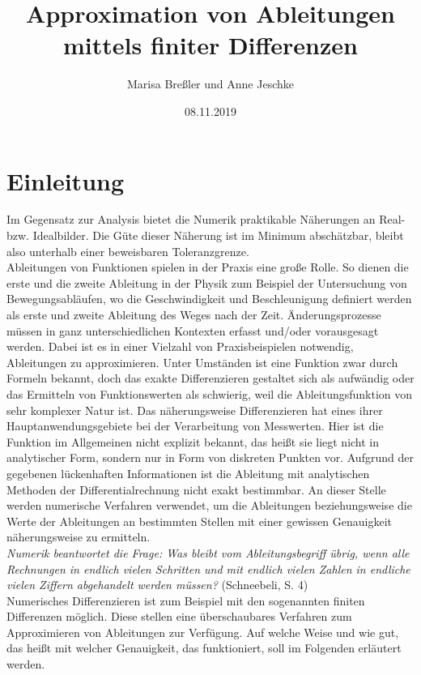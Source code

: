 \documentclass{scrartcl}
\begin{document}
\title{Approximation von Ableitungen\\mittels finiter Differenzen}
\author{Marisa Breßler und Anne Jeschke}
\date{08.11.2019}
\maketitle
\tableofcontents
\pagebreak \section{Einleitung}
\label{sec:einleitung}
Im Gegensatz zur Analysis bietet die Numerik praktikable Näherungen an Real- bzw. Idealbilder. Die Güte dieser Näherung ist im Minimum abschätzbar, bleibt also unterhalb einer beweisbaren Toleranzgrenze. \\
Ableitungen von Funktionen spielen in der Praxis eine große Rolle. So dienen die erste und die zweite Ableitung in der Physik zum Beispiel der Untersuchung von Bewegungsabläufen, wo die Geschwindigkeit und Beschleunigung definiert werden als erste und zweite Ableitung des Weges nach der Zeit. Änderungsprozesse müssen in ganz unterschiedlichen Kontexten erfasst und/oder vorausgesagt werden. Dabei ist es in einer Vielzahl von Praxisbeispielen notwendig, Ableitungen zu approximieren. Unter Umständen ist eine Funktion zwar durch Formeln bekannt, doch das exakte Differenzieren gestaltet sich als aufwändig oder das Ermitteln von Funktionswerten als schwierig, weil die Ableitungsfunktion von sehr komplexer Natur ist. Das näherungsweise Differenzieren hat eines ihrer Hauptanwendungsgebiete bei der Verarbeitung von Messwerten. Hier ist die Funktion im Allgemeinen nicht explizit bekannt, das heißt sie liegt nicht in analytischer Form, sondern nur in Form von diskreten Punkten vor. Aufgrund der gegebenen lückenhaften Informationen ist die Ableitung mit analytischen Methoden der Differentialrechnung nicht exakt bestimmbar. An dieser Stelle werden numerische Verfahren verwendet, um die Ableitungen beziehungsweise die Werte der Ableitungen an bestimmten Stellen mit einer gewissen Genauigkeit näherungsweise zu ermitteln. \\
\linebreak
\textit{Numerik beantwortet die Frage: Was bleibt vom Ableitungsbegriff übrig, wenn alle Rechnungen in endlich vielen Schritten und mit endlich vielen Zahlen in endliche vielen Ziffern abgehandelt werden müssen?} (Schneebeli, S. 4)\\
\linebreak
Numerisches Differenzieren ist zum Beispiel mit den sogenannten finiten Differenzen möglich. Diese stellen eine überschaubares Verfahren zum Approximieren von Ableitungen zur Verfügung. Auf welche Weise und wie gut, das heißt mit welcher Genauigkeit, das funktioniert, soll im Folgenden erläutert werden. \\
\end{document}
